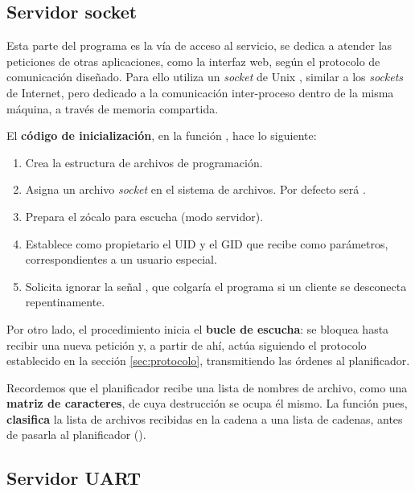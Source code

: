 \smallskip

\subsection{Servidor socket}

Esta parte del programa es la vía de acceso al servicio, se dedica a atender las peticiones de otras aplicaciones, como la interfaz web, según el protocolo de comunicación diseñado. Para ello utiliza un \textit{socket} de Unix \cite{wiki_socket}, similar a los \textit{sockets} de Internet, pero dedicado a la comunicación inter-proceso dentro de la misma máquina, a través de memoria compartida.

El \textbf{código de inicialización}, en la función , hace lo siguiente:

\begin{enumerate}
	\item Crea la estructura de archivos de programación.
	\item Asigna un archivo \textit{socket} en el sistema de archivos. Por defecto será .
	\item Prepara el zócalo para escucha (modo servidor).
	\item Establece como propietario el \acrshort{UID} y el \acrshort{GID} que recibe como parámetros, correspondientes a un usuario especial.
	\item Solicita ignorar la señal , que colgaría el programa si un cliente se desconecta repentinamente.
\end{enumerate}

Por otro lado, el procedimiento  inicia el \textbf{bucle de escucha}: se bloquea hasta recibir una nueva petición y, a partir de ahí, actúa siguiendo el protocolo establecido en la sección \ref{sec:protocolo}, transmitiendo las órdenes al planificador.

Recordemos que el planificador recibe una lista de nombres de archivo, como una \textbf{matriz de caracteres}, de cuya destrucción se ocupa él mismo. La función  pues, \textbf{clasifica} la lista de archivos recibidas en la cadena a una lista de cadenas, antes de pasarla al planificador ().

\subsection{Servidor UART}

